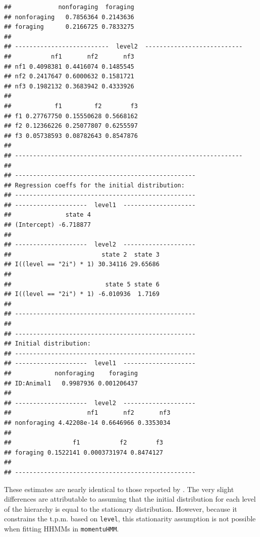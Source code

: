 \documentclass[12pt]{article}\usepackage[]{graphicx}\usepackage[]{color}
\makeatletter
\newenvironment{kframe}{%
 \def\at@end@of@kframe{}%
 \ifinner\ifhmode%
  \def\at@end@of@kframe{\end{minipage}}%
  \begin{minipage}{\columnwidth}%
 \fi\fi%
 \def\FrameCommand##1{\hskip\@totalleftmargin \hskip-\fboxsep
 \colorbox{shadecolor}{##1}\hskip-\fboxsep
     \hskip-\linewidth \hskip-\@totalleftmargin \hskip\columnwidth}%
 \MakeFramed {\advance\hsize-\width
   \@totalleftmargin\z@ \linewidth\hsize
   \@setminipage}}%
 {\par\unskip\endMakeFramed%
 \at@end@of@kframe}
\newenvironment{knitrout}{}{} %
\makeatother
\begin{document}
\begin{knitrout}
\begin{kframe}
\begin{verbatim}
##             nonforaging  foraging
## nonforaging   0.7856364 0.2143636
## foraging      0.2166725 0.7833275
## 
## --------------------------  level2  ---------------------------
##           nf1       nf2       nf3
## nf1 0.4098381 0.4416074 0.1485545
## nf2 0.2417647 0.6000632 0.1581721
## nf3 0.1982132 0.3683942 0.4333926
## 
##            f1         f2        f3
## f1 0.27767750 0.15550628 0.5668162
## f2 0.12366226 0.25077807 0.6255597
## f3 0.05738593 0.08782643 0.8547876
## 
## ---------------------------------------------------------------
## 
## --------------------------------------------------
## Regression coeffs for the initial distribution:
## --------------------------------------------------
## --------------------  level1  --------------------
##               state 4
## (Intercept) -6.718877
## 
## --------------------  level2  --------------------
##                         state 2  state 3
## I((level == "2i") * 1) 30.34116 29.65686
## 
##                          state 5 state 6
## I((level == "2i") * 1) -6.010936  1.7169
## 
## --------------------------------------------------
## 
## --------------------------------------------------
## Initial distribution:
## --------------------------------------------------
## --------------------  level1  --------------------
##            nonforaging    foraging
## ID:Animal1   0.9987936 0.001206437
## 
## --------------------  level2  --------------------
##                     nf1       nf2       nf3
## nonforaging 4.42208e-14 0.6646966 0.3353034
## 
##                 f1           f2        f3
## foraging 0.1522141 0.0003731974 0.8474127
## 
## --------------------------------------------------
\end{verbatim}
\end{kframe}
\end{knitrout}
\noindent These estimates are nearly identical to those reported by \cite{Leos-BarajasEtAl2017}.  The very slight differences are attributable to \cite{Leos-BarajasEtAl2017} assuming that the initial distribution for each level of the hierarchy is equal to the stationary distribution. However, because it constrains the t.p.m. based on \verb|level|, this stationarity assumption is not possible when fitting HHMMs in \verb|momentuHMM|.  
\end{document}
